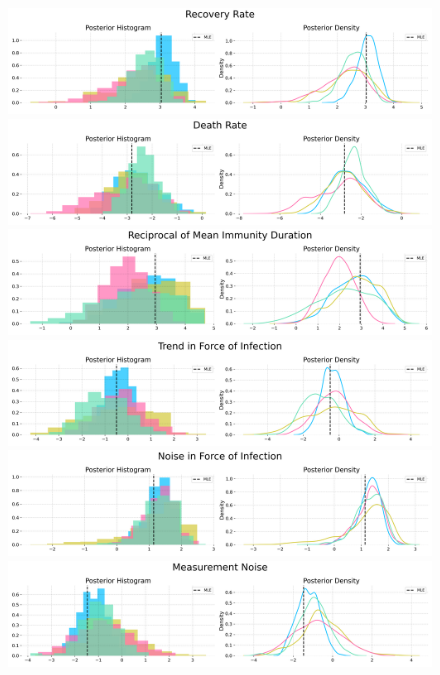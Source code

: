 \begin{figure}[H]
    \centering
    \includegraphics[scale=0.33]{imgs/pmcmc/nuts_eb/Recovery_Rate.png}
    \includegraphics[scale=0.33]{imgs/pmcmc/nuts_eb/Death_Rate.png}
    \includegraphics[scale=0.33]{imgs/pmcmc/nuts_eb/Reciprocal_of_Mean_Immunity_Duration.png}
    \includegraphics[scale=0.33]{imgs/pmcmc/nuts_eb/Trend_in_Force_of_Infection.png}
    \includegraphics[scale=0.33]{imgs/pmcmc/nuts_eb/Noise_in_Force_of_Infection.png}
    \includegraphics[scale=0.33]{imgs/pmcmc/nuts_eb/Measurement_Noise.png}

\end{figure}
